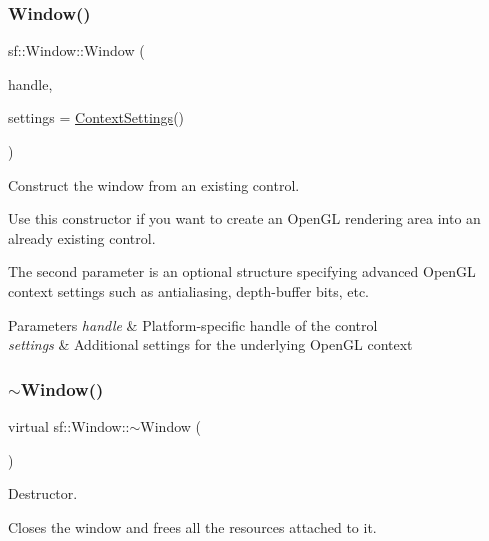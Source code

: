 \subsubsection{\texorpdfstring{Window()}{Window()}\hspace{0.1cm}{\footnotesize\ttfamily [3/3]}}
{\footnotesize\ttfamily sf\+::\+Window\+::\+Window (\begin{DoxyParamCaption}\item[{Window\+Handle}]{handle,  }\item[{const \hyperlink{structsf_1_1_context_settings}{Context\+Settings} \&}]{settings = {\ttfamily \hyperlink{structsf_1_1_context_settings}{Context\+Settings}()} }\end{DoxyParamCaption})\hspace{0.3cm}{\ttfamily [explicit]}}



Construct the window from an existing control. 

Use this constructor if you want to create an Open\+GL rendering area into an already existing control.

The second parameter is an optional structure specifying advanced Open\+GL context settings such as antialiasing, depth-\/buffer bits, etc.


\begin{DoxyParams}{Parameters}
{\em handle} & Platform-\/specific handle of the control \\
\hline
{\em settings} & Additional settings for the underlying Open\+GL context \\
\hline
\end{DoxyParams}
\mbox{\label{classsf_1_1_window_ac30eb6ea5f5594204944d09d4bd69a97}} 
\subsubsection{\texorpdfstring{$\sim$\+Window()}{~Window()}}
{\footnotesize\ttfamily virtual sf\+::\+Window\+::$\sim$\+Window (\begin{DoxyParamCaption}{ }\end{DoxyParamCaption})\hspace{0.3cm}{\ttfamily [virtual]}}



Destructor. 

Closes the window and frees all the resources attached to it. 

